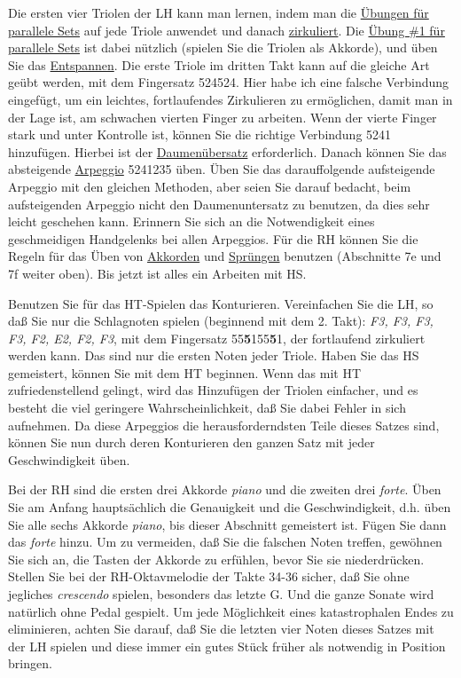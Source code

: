 Die ersten vier Triolen der LH kann man lernen, indem man die \hyperlink{c1iii7b}{Übungen für parallele Sets} auf jede Triole anwendet und danach \hyperlink{c1iii2}{zirkuliert}.
Die \hyperlink{c1iii7b1}{Übung \#1 für parallele Sets} ist dabei nützlich (spielen Sie die Triolen als Akkorde), und üben Sie das \hyperlink{c1ii14}{Entspannen}.
Die erste Triole im dritten Takt kann auf die gleiche Art geübt werden, mit dem Fingersatz 524524.
Hier habe ich eine falsche Verbindung eingefügt, um ein leichtes, fortlaufendes Zirkulieren zu ermöglichen, damit man in der Lage ist, am schwachen vierten Finger zu arbeiten.
Wenn der vierte Finger stark und unter Kontrolle ist, können Sie die richtige Verbindung 5241 hinzufügen.
Hierbei ist der \hyperlink{c1iii5}{Daumenübersatz} erforderlich.
Danach können Sie das absteigende \hyperlink{Arpeggios}{Arpeggio} 5241235 üben.
Üben Sie das darauffolgende aufsteigende Arpeggio mit den gleichen Methoden, aber seien Sie darauf bedacht, beim aufsteigenden Arpeggio nicht den Daumenuntersatz zu benutzen, da dies sehr leicht geschehen kann.
Erinnern Sie sich an die Notwendigkeit eines geschmeidigen Handgelenks bei allen Arpeggios.
Für die RH können Sie die Regeln für das Üben von \hyperlink{c1iii7e}{Akkorden} und \hyperlink{c1iii7f}{Sprüngen} benutzen (Abschnitte 7e und 7f weiter oben).
Bis jetzt ist alles ein Arbeiten mit HS.

Benutzen Sie für das HT-Spielen das Konturieren.
Vereinfachen Sie die LH, so daß Sie nur die Schlagnoten spielen (beginnend mit dem 2. Takt): \textit{F3, F3, F3, F3, F2, E2, F2, F3}, mit dem Fingersatz 55\textbf{5}155\textbf{5}1, der fortlaufend zirkuliert werden kann.
Das sind nur die ersten Noten jeder Triole.
Haben Sie das HS gemeistert, können Sie mit dem HT beginnen.
Wenn das mit HT zufriedenstellend gelingt, wird das Hinzufügen der Triolen einfacher, und es besteht die viel geringere Wahrscheinlichkeit, daß Sie dabei Fehler in sich aufnehmen.
Da diese Arpeggios die herausforderndsten Teile dieses Satzes sind, können Sie nun durch deren Konturieren den ganzen Satz mit jeder Geschwindigkeit üben.

Bei der RH sind die ersten drei Akkorde \textit{piano} und die zweiten drei \textit{forte}.
Üben Sie am Anfang hauptsächlich die Genauigkeit und die Geschwindigkeit, d.h. üben Sie alle sechs Akkorde \textit{piano}, bis dieser Abschnitt gemeistert ist.
Fügen Sie dann das \textit{forte} hinzu.
Um zu vermeiden, daß Sie die falschen Noten treffen, gewöhnen Sie sich an, die Tasten der Akkorde zu erfühlen, bevor Sie sie niederdrücken.
Stellen Sie bei der RH-Oktavmelodie der Takte 34-36 sicher, daß Sie ohne jegliches \textit{crescendo} spielen, besonders das letzte G.
Und die ganze Sonate wird natürlich ohne Pedal gespielt.
Um jede Möglichkeit eines katastrophalen Endes zu eliminieren, achten Sie darauf, daß Sie die letzten vier Noten dieses Satzes mit der LH spielen und diese immer ein gutes Stück früher als notwendig in Position bringen.

